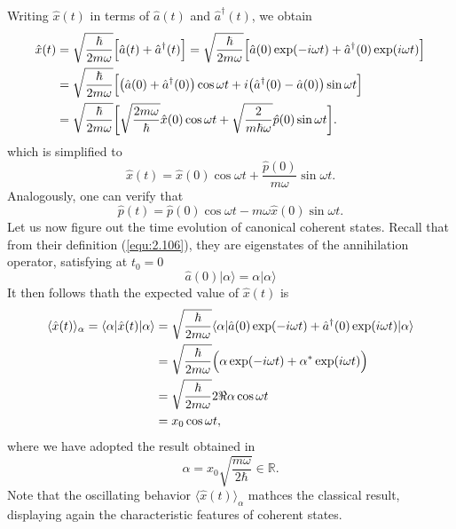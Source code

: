 Writing $\hat{x}(t)$ in terms of $\hat{a}(t)$ and
$\hat{a}^{\dagger}(t)$, we obtain
\begin{align}
  \hat{x}(t) &= \sqrt{\frac{\hbar}{2m\omega}}
  \Bigl[\hat{a}(t) + \hat{a}^{\dagger}(t)\Bigr] =
  \sqrt{\frac{\hbar}{2m\omega}} \Bigl[
    \hat{a}(0) \exp(-i\omega t) +
    \hat{a}^{\dagger}(0)\exp(i\omega t) \Bigr] \nonumber \\
    &=\sqrt{\frac{\hbar}{2m\omega}} \Bigl[
    \bigl(\hat{a}(0)+\hat{a}^{\dagger}(0)\bigr)\cos \omega t
    +i\bigl(
      \hat{a}^{\dagger}(0) - \hat{a}(0)
    \bigr)\sin \omega t\Bigr] \nonumber \\
    &=\sqrt{\frac{\hbar}{2m\omega}} \biggl[
    \sqrt{\frac{2m\omega}{\hbar}}\hat{x}(0) \cos \omega t +
    \sqrt{\frac{2}{m\hbar\omega}} \hat{p}(0) \sin \omega t
  \biggr].\nonumber
\end{align}
which is simplified to
\begin{equation}
  \hat{x}(t) = \hat{x}(0) \cos \omega t +
  \frac{\hat{p}(0)}{m\omega} \sin \omega t.
  \label{equ:2.201}
\end{equation}
Analogously, one can verify that
\begin{equation}
  \hat{p}(t) = \hat{p}(0) \cos \omega t - m \omega
  \hat{x}(0) \sin \omega t.
  \label{equ:2.202}
\end{equation}
Let us now figure out the time evolution of canonical
coherent states. Recall that from their definition
(\ref{equ:2.106}), they are eigenstates of the annihilation
operator, satisfying at $t_0 = 0$
\begin{equation}
  \hat{a}(0) \vert \alpha \rangle = \alpha \vert \alpha
  \rangle
  \label{equ:2.203}
\end{equation}
It then follows thath the expected value of $\hat{x}(t)$ is
\begin{align}
  \langle \hat{x}(t) \rangle_{\alpha} = \langle \alpha \vert
  \hat{x}(t) \vert \alpha \rangle &=
  \sqrt{\frac{\hbar}{2m\omega}} \langle \alpha \vert
  \hat{a}(0) \exp(-i\omega t) + \hat{a}^{\dagger}(0)
  \exp(i\omega t) \vert \alpha \rangle \nonumber\\
  &= \sqrt{\frac{\hbar}{2m\omega}} \Bigl(\alpha
  \exp(-i\omega t) + \alpha^* \exp(i\omega t)\Bigr)
  \nonumber\\
  &= \sqrt{\frac{\hbar}{2m\omega}} 2 \Re \alpha \cos \omega
  t \nonumber \\
  &= x_0 \cos \omega t,\label{equ:2.204}
\end{align}
where we have adopted the result obtained in %
\begin{equation}
  \alpha = x_0 \sqrt{\frac{m\omega}{2\hbar}} \in \mathbb{R}.
  \label{equ:2.205}
\end{equation}
Note that the oscillating behavior $\langle \hat{x}(t)
\rangle_{\alpha}$ mathces the classical result, displaying
again the characteristic features of coherent states.


